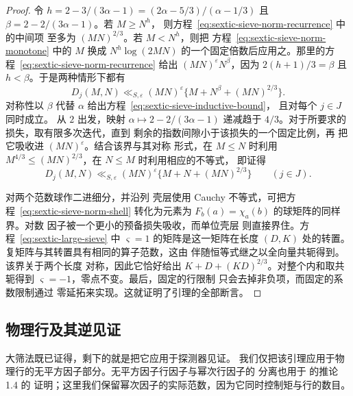 \documentclass[11pt,a4paper]{article}
\numberwithin{equation}{section}
\numberwithin{figure}{section}
\theoremstyle{definition}
\theoremstyle{remark}
\begin{document}
\begin{proof}
令 $h=2-3/(3\alpha-1)=(2\alpha-5/3)/(\alpha-1/3)$ 且
$\beta=2-2/(3\alpha-1)$。若 $M\ge N^h$，
则方程~\eqref{eq:sextic-sieve-norm-recurrence} 中的中间项
至多为 $(MN)^{2/3}$。若 $M<N^h$，则把
方程~\eqref{eq:sextic-sieve-norm-monotone} 中的 $M$ 换成
$N^h\log(2MN)$ 的一个固定倍数后应用之。那里的方程~\eqref{eq:sextic-sieve-norm-recurrence}
给出 $(MN)^\varepsilon N^\beta$，因为
$2(h+1)/3=\beta$ 且 $h<\beta$。于是两种情形下都有
\[
 D_j(M,N)\ll_{S,\varepsilon}(MN)^\varepsilon
                   \{M+N^\beta+(MN)^{2/3}\}.
\]
对称性以 $\beta$ 代替 $\alpha$ 给出方程~\eqref{eq:sextic-sieve-inductive-bound}，
且对每个 $j\in J$ 同时成立。
从 $2$ 出发，映射 $\alpha\mapsto2-2/(3\alpha-1)$ 递减趋于
$4/3$。对于所要求的损失，取有限多次迭代，直到
剩余的指数间隙小于该损失的一个固定比例，再
把它吸收进 $(MN)^\varepsilon$。结合该界与其对称
形式，在 $M\le N$ 时利用
$M^{4/3}\le(MN)^{2/3}$，在 $N\le M$ 时利用相应的不等式，
即证得
\begin{equation}\label{eq:sextic-sieve-norm-shell}
 D_j(M,N)\ll_{S,\varepsilon}(MN)^\varepsilon
               \{M+N+(MN)^{2/3}\}\qquad(j\in J).
\end{equation}

对两个范数球作二进细分，并沿列
壳层使用 Cauchy 不等式，可把方程~\eqref{eq:sextic-sieve-norm-shell} 转化为元素为
$F_b(a)=\chi_a(b)$ 的球矩阵的同样
界。对数
因子被一个更小的预备损失吸收，而单位壳层
则直接界住。方程~\eqref{eq:sextic-large-sieve}
中 $\varsigma=1$ 的矩阵是这一矩阵在长度 $(D,K)$ 处的转置。
复矩阵与其转置具有相同的算子范数，这由
伴随恒等式继之以全向量共轭得到。该界关于两个长度
对称，因此它恰好给出
$K+D+(KD)^{2/3}$。对整个内和取共轭得到
$\varsigma=-1$，零点不变。最后，固定的行限制
只会去掉非负项，而固定的系数限制通过
零延拓来实现。这就证明了引理的全部断言。
\end{proof}

\subsection{物理行及其逆见证}

大筛法既已证得，剩下的就是把它应用于探测器见证。
我们仅把该引理应用于物理行的无平方因子部分。无平方因子行因子与幂次行因子的
分离也用于 \cite{BGL} 的推论 1.4 的
证明；这里我们保留幂次因子的实际范数，因为它同时控制矩与行的数目。
\end{document}
